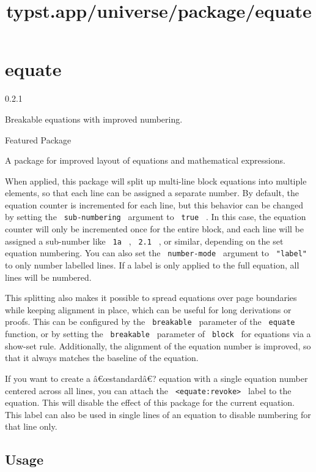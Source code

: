 \title{typst.app/universe/package/equate}

\label{banner}
\section{equate}\label{equate}

{ 0.2.1 }

Breakable equations with improved numbering.

{ } Featured Package

\label{readme}
A package for improved layout of equations and mathematical expressions.

When applied, this package will split up multi-line block equations into
multiple elements, so that each line can be assigned a separate number.
By default, the equation counter is incremented for each line, but this
behavior can be changed by setting the \texttt{\ sub-numbering\ }
argument to \texttt{\ true\ } . In this case, the equation counter will
only be incremented once for the entire block, and each line will be
assigned a sub-number like \texttt{\ 1a\ } , \texttt{\ 2.1\ } , or
similar, depending on the set equation numbering. You can also set the
\texttt{\ number-mode\ } argument to \texttt{\ "label"\ } to only number
labelled lines. If a label is only applied to the full equation, all
lines will be numbered.

This splitting also makes it possible to spread equations over page
boundaries while keeping alignment in place, which can be useful for
long derivations or proofs. This can be configured by the
\texttt{\ breakable\ } parameter of the \texttt{\ equate\ } function, or
by setting the \texttt{\ breakable\ } parameter of \texttt{\ block\ }
for equations via a show-set rule. Additionally, the alignment of the
equation number is improved, so that it always matches the baseline of
the equation.

If you want to create a â€œstandardâ€? equation with a single equation
number centered across all lines, you can attach the
\texttt{\ \textless{}equate:revoke\textgreater{}\ } label to the
equation. This will disable the effect of this package for the current
equation. This label can also be used in single lines of an equation to
disable numbering for that line only.

\subsection{Usage}\label{usage}

